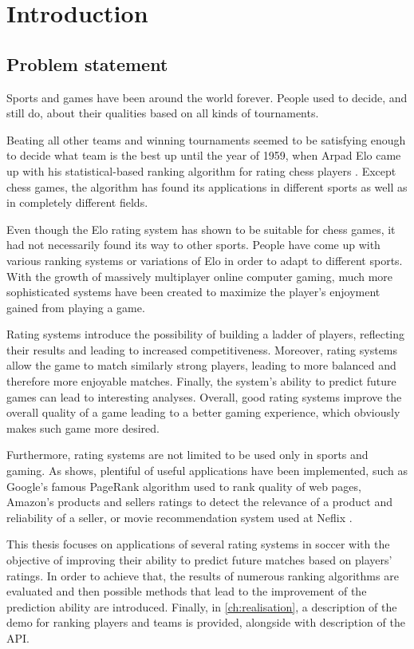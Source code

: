 \chapter{Introduction}
\section{Problem statement}
Sports and games have been around the world forever. People used to decide, and still do, about their qualities based on all kinds of tournaments. 

Beating all other teams and winning tournaments seemed to be satisfying enough to decide what team is the best up until the year of 1959, when Arpad Elo came up with his statistical-based ranking algorithm for rating chess players \citep{Eloratingchessplayerspresent1978}. Except chess games, the algorithm has found its applications in different sports as well as in completely different fields.

Even though the Elo rating system has shown to be suitable for chess games, it had not necessarily found its way to other sports. People have come up with various ranking systems or variations of Elo in order to adapt to different sports. With the growth of massively multiplayer online computer gaming, much more sophisticated systems have been created to maximize the player's enjoyment gained from playing a game.

Rating systems introduce the possibility of building a ladder of players, reflecting their results and leading to increased competitiveness. Moreover, rating systems allow the game to match similarly strong players, leading to more balanced and therefore more enjoyable matches. Finally, the system's ability to predict future games can lead to interesting analyses. Overall, good rating systems improve the overall quality of a game leading to a better gaming experience, which obviously makes such game more desired.

Furthermore, rating systems are not limited to be used only in sports and gaming. As \citet{RainieUseOnlineRating2004} shows, plentiful of useful applications have been implemented, such as Google's famous PageRank algorithm \citep{PagePageRankcitationranking1998} used to rank quality of web pages, Amazon's products and sellers ratings \citep{ZhangMiningmillionsreviews2012} to detect the relevance of a product and reliability of a seller, or movie recommendation system used at Neflix \citep{FernandezRecommendationSystemNetflix2018}.

This thesis focuses on applications of several rating systems in soccer with the objective of improving their ability to predict future matches based on players' ratings. In order to achieve that, the results of numerous ranking algorithms are evaluated and then possible methods that lead to the improvement of the prediction ability are introduced. Finally, in \autoref{ch:realisation}, a description of the demo for ranking players and teams is provided, alongside with description of the API.

